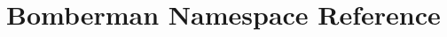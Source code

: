 \hypertarget{namespace_bomberman}{}\section{Bomberman Namespace Reference}
\label{namespace_bomberman}
